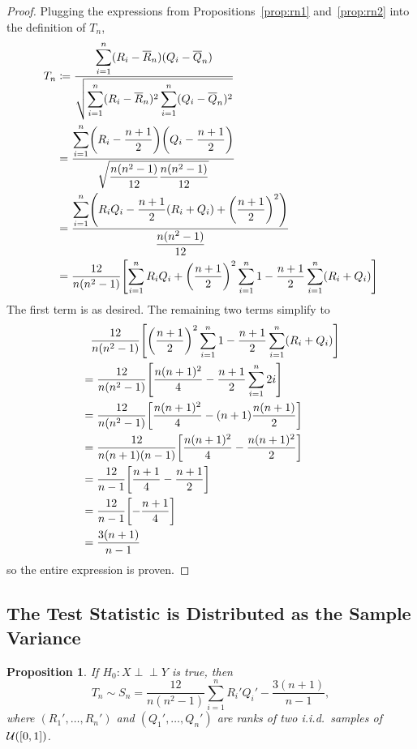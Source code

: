 \documentclass[letterpaper, reqno]{amsart}
\newtheorem{prop}{Proposition}[section]
\numberwithin{equation}{section}
\newcommand{\ddfrac}[2]{\frac{\displaystyle #1}{\displaystyle #2}}
\newcommand{\U}[2]{\mathcal{U}\mleft(\mleft[ #1, #2 \mright]\mright)}
\newcommand{\indep}{\perp \!\!\! \perp}  %
\newcommand{\iid}{i.i.d.}
\newcommand{\sumi}[2]{\sum_{#1=1}^{#2}}
\newcommand{\Rnbar}{\overline{R}_n}
\newcommand{\Qnbar}{\overline{Q}_n}
\begin{document}
\begin{proof}
Plugging the expressions from Propositions~\ref{prop:rn1} and~\ref{prop:rn2}
into the definition of $T_n$,
\begin{align*}
  T_n &\coloneqq \ddfrac{\sumi{i}{n}(R_i - \Rnbar)(Q_i - \Qnbar)}
                            {\sqrt{\sumi{i}{n} (R_i - \Rnbar)^2 \sumi{i}{n} (Q_i - \Qnbar)^2}} \\
  &= \ddfrac{\sumi{i}{n}\mleft(R_i - \frac{n+1}{2}\mright)\mleft(Q_i - \frac{n+1}{2}\mright)}
                            {\sqrt{\frac{n(n^2 - 1)}{12} \frac{n(n^2 - 1)}{12}}} \\
  &= \ddfrac{\sumi{i}{n}\mleft(R_iQ_i 
                              - \frac{n+1}{2}(R_i + Q_i) 
                              + \mleft(\frac{n+1}{2}\mright)^2 \mright)}
                            {\frac{n(n^2 - 1)}{12}} \\
  &= \frac{12}{n(n^2 - 1)} \mleft[ \sumi{i}{n}R_iQ_i 
  + \mleft(\frac{n+1}{2}\mright)^2  \sumi{i}{n} 1
  - \frac{n+1}{2}\sumi{i}{n}(R_i + Q_i) \mright]
\end{align*}
The first term is as desired. The remaining two terms simplify to
\begin{align*}
  &\phantom{=} \frac{12}{n(n^2 - 1)} \mleft[ \mleft(\frac{n+1}{2}\mright)^2  \sumi{i}{n} 1
  - \frac{n+1}{2}\sumi{i}{n}(R_i + Q_i) \mright]  \\
  &= \frac{12}{n(n^2 - 1)} \mleft[ \frac{n(n+1)^2}{4} - \frac{n+1}{2}\sumi{i}{n}2i \mright] \\
  &= \frac{12}{n(n^2 - 1)} \mleft[ \frac{n(n+1)^2}{4} - (n+1)\frac{n(n+1)}{2} \mright] \\
  &= \frac{12}{n(n+1)(n-1)} \mleft[ \frac{n(n+1)^2}{4} - \frac{n(n+1)^2}{2} \mright] \\
  &= \frac{12}{n-1} \mleft[ \frac{n+1}{4} - \frac{n+1}{2} \mright] \\
  &= \frac{12}{n-1} \mleft[ -\frac{n+1}{4} \mright] \\
  &= \frac{3(n+1)}{n-1}
\end{align*}
so the entire expression is proven.
\end{proof}

\subsection{The Test Statistic is Distributed as the Sample Variance}
\begin{prop}
  If $H_0 \colon X \indep Y$ is true, then
  \[ T_n \sim S_n = \frac{12}{n(n^2 - 1)} \sumi{i}{n} R_i' Q_i' - \frac{3(n+1)}{n-1}, \]
  where $(R_1', \dots, R_n')$ and $(Q_1', \dots, Q_n')$ are ranks of two \iid\
  samples of $\U{0}{1}$.
\end{prop}
\end{document}
